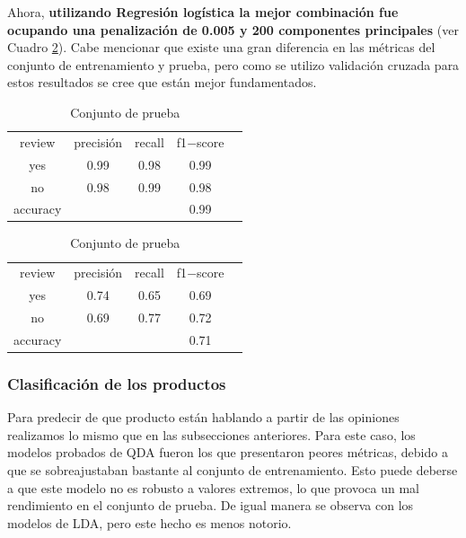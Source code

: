 \documentclass[paper=letter, fontsize=11pt]{scrartcl}
\numberwithin{equation}{section} %
\numberwithin{figure}{section} %
\numberwithin{table}{section} %
\begin{document}
Ahora, \textbf{utilizando Regresión logística la mejor combinación fue ocupando una penalización de 0.005 y 200 componentes principales} (ver Cuadro \ref{metricas_reviews}). Cabe mencionar que existe una gran diferencia en las métricas del conjunto de entrenamiento y prueba, pero como se utilizo validación cruzada para estos resultados se cree que están mejor fundamentados. 
\begin{table}[H]
    \centering 
    \caption{Comparación de métricas en el conjunto de entrenamiento y prueba, Reg Log.} \label{metricas_reviews}
\begin{minipage}{.5\linewidth}
        \caption{Conjunto de entrenamiento}
        \centering
        \begin{tabular}{|c|c|c|c|c}
        \hline
review  & precisión &  recall & f1$-$score\\
yes     &   0.99  &  0.98   & 0.99\\  
no      &   0.98  &  0.99   & 0.98\\  \hline \hline
accuracy  & & & 0.99\\ \hline \hline
        \end{tabular}
    \end{minipage}%
    \begin{minipage}{.5\linewidth}
      \centering
        \caption{Conjunto de prueba}
        \begin{tabular}{|c|c|c|c|c}
        \hline
review  & precisión &  recall & f1$-$score\\
yes     &   0.74  &  0.65   & 0.69\\  
no      &   0.69  &  0.77   & 0.72\\  \hline \hline
accuracy  & & & 0.71\\ \hline \hline
        \end{tabular}
    \end{minipage} 
\end{table}

\subsubsection{Clasificación de los productos}
Para predecir de que producto están hablando a partir de las opiniones realizamos lo mismo que en las subsecciones anteriores. Para este caso, los modelos probados de QDA fueron los que presentaron peores métricas, debido a que se sobreajustaban bastante al conjunto de entrenamiento. Esto puede deberse a que este modelo no es robusto a valores extremos, lo que provoca un mal rendimiento en el conjunto de prueba. De igual manera se observa con los modelos de LDA, pero este hecho es menos notorio.\\
\end{document}
